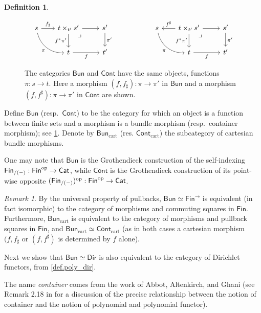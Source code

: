 \documentclass[11pt, article, one side]{memoir}
\theoremstyle{theorem}
\theoremstyle{definition}
\newtheorem{definition}[section]{Definition}
\theoremstyle{remark}
\newtheorem{remark}[section]{Remark}
\newcommand{\Cat}[1]{\mathsf{#1}}%
\newcommand{\op}{^\tn{op}}
\newcommand{\tn}[1]{\textnormal{#1}}
\newcommand{\smcat}{\Cat{Cat}}
\newcommand{\finset}{\Cat{Fin}}
\newcommand{\cont}{\Cat{Cont}}
\newcommand{\bun}{\Cat{Bun}}
\newcommand{\dir}{\Cat{Dir}}
\begin{document}
\begin{definition}
\begin{figure}
\[
\begin{tikzcd}
s\ar[dr, bend right=40pt, "\pi"']&[-5pt]
t\times_{t'}s'\ar[r]\ar[d, "f^*\pi'"']\ar[from=l, "f_\sharp"]&
s'\ar[d, "\pi'"]\\&
t\ar[r, "f"']&
t'\ar[ul, phantom, very near end, "\lrcorner"]
\end{tikzcd}
\hspace{.75in}
\begin{tikzcd}
s\ar[dr, bend right=40pt, "\pi"']&[-5pt]
t\times_{t'}s'\ar[r]\ar[d, "f^*\pi'"']\ar[l, "f^\sharp"']&
s'\ar[d, "\pi'"]\\&
t\ar[r, "f"']&
t'\ar[ul, phantom, very near end, "\lrcorner"]
\end{tikzcd}
\]
\caption{The categories $\bun$ and $\cont$ have the same objects, functions $\pi\colon s\to t$. Here a morphism $(f,f_\sharp)\colon \pi\to \pi'$ in $\bun$ and a morphism $(f,f^\sharp)\colon \pi\to\pi'$ in $\cont$ are shown.
}
\label{fig.bund_cont_maps}
\end{figure}
Define $\bun$ (resp.\ $\cont$) to be the category for which an object is a function between finite sets and a morphism is a bundle morphism (resp.\ container morphism); see \cref{fig.bund_cont_maps}. Denote by $\bun_{\text{cart}}$ (res. $\cont_{\text{cart}}$) the subcategory of cartesian bundle morphisms.
\end{definition}

One may note that $\bun$ is the Grothendieck construction of the self-indexing $\finset_{/(-)} : \finset\op \to \smcat$, while $\cont$ is the Grothendieck construction of its point-wise opposite $(\finset_{/(-)})\op : \finset\op \to \smcat$.

\begin{remark}\label{rem.dir_fin2}
By the universal property of pullbacks, $\bun\simeq\finset^{\to}$ is equivalent (in fact isomorphic) to the category of morphisms and commuting squares in $\finset$. Furthermore, $\bun_{\text{cart}}$ is equivalent to the category of morphisms and pullback squares in $\finset$, and $\bun_{\text{cart}} \simeq \cont_{\text{cart}}$ (as in both cases a cartesian morphism $(f, f_{\sharp}$ or $(f, f^{\sharp})$ is determined by $f$ alone).

Next we show that $\bun\simeq\dir$ is also equivalent to the category of Dirichlet functors, from \cref{def.poly_dir}.

 The name \emph{container} comes from the work of Abbot, Altenkirch, and Ghani \cites{AAG:Containers.In.Proceedings}{AAG:Containers}{A:Containers.Thesis} (see Remark 2.18 in \cite{GK:Polynomial.Functors} for a discussion of the precise relationship between the notion of container and the notion of polynomial and polynomial functor).
\end{remark}
\end{document}
